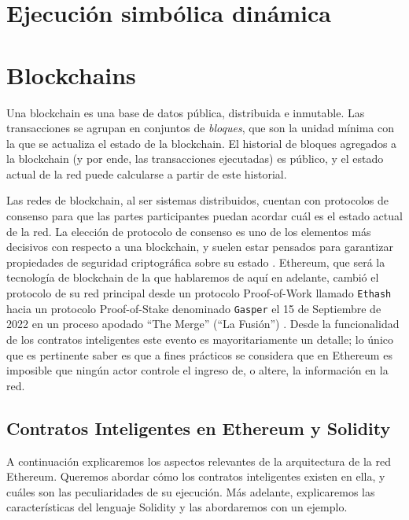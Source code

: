 \section{Ejecución simbólica dinámica}

\section{Blockchains}
Una blockchain es una base de datos pública, distribuida e inmutable.
Las transacciones se agrupan en conjuntos de \textit{bloques}, que son la unidad mínima con la que se actualiza el estado de la blockchain.
El historial de bloques agregados a la blockchain (y por ende, las transacciones ejecutadas) es público, y el estado actual de la red puede calcularse a partir de este historial.

Las redes de blockchain, al ser sistemas distribuidos, cuentan con protocolos de consenso para que las partes participantes puedan acordar cuál es el estado actual de la red.
La elección de protocolo de consenso es uno de los elementos más decisivos con respecto a una blockchain, y suelen estar pensados para garantizar propiedades de seguridad criptográfica sobre su estado \cite{bitcoin-backbone-protocol}\cite{ouroboros-protocol}\cite{survey-on-protocols}.
Ethereum, que será la tecnología de blockchain de la que hablaremos de aquí en adelante, cambió el protocolo de su red principal desde un protocolo Proof-of-Work llamado \texttt{Ethash} hacia un protocolo Proof-of-Stake denominado \texttt{Gasper} el 15 de Septiembre de 2022 en un proceso apodado ``The Merge'' (``La Fusión'') \cite{survey-of-blockchain-security} \cite{ethereum-yellow-paper} \cite{gasper-protocol} \cite{the-ethereum-merge}.
Desde la funcionalidad de los contratos inteligentes este evento es mayoritariamente un detalle; lo único que es pertinente saber es que a fines prácticos se considera que en Ethereum es imposible que ningún actor controle el ingreso de, o altere, la información en la red.

\subsection{Contratos Inteligentes en Ethereum y Solidity}
A continuación explicaremos los aspectos relevantes de la arquitectura de la red Ethereum.
Queremos abordar cómo los contratos inteligentes existen en ella, y cuáles son las peculiaridades de su ejecución.
Más adelante, explicaremos las características del lenguaje Solidity y las abordaremos con un ejemplo.

